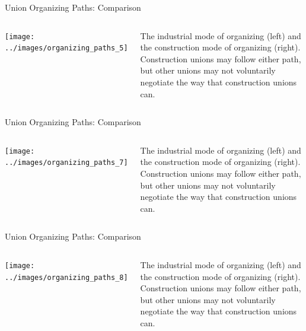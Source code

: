 \documentclass{beamer}
\begin{document}
%

\begin{frame}{Union Organizing Paths: Comparison} %
  \begin{columns}
    \texttt{[image: ../images/organizing\_paths\_5]}

    The industrial mode of organizing (left) and the construction mode of organizing (right).\newline\newline
    Construction unions may follow either path, but other unions may not voluntarily negotiate the way that construction unions can.
    \end{columns}
\end{frame}

\begin{frame}{Union Organizing Paths: Comparison} %
  \begin{columns}
    \texttt{[image: ../images/organizing\_paths\_7]}

    The industrial mode of organizing (left) and the construction mode of organizing (right).\newline\newline
    Construction unions may follow either path, but other unions may not voluntarily negotiate the way that construction unions can.
    \end{columns}
\end{frame}

\begin{frame}{Union Organizing Paths: Comparison} %
  \begin{columns}
    \texttt{[image: ../images/organizing\_paths\_8]}

    The industrial mode of organizing (left) and the construction mode of organizing (right).\newline\newline
    Construction unions may follow either path, but other unions may not voluntarily negotiate the way that construction unions can.
    \end{columns}
\end{frame}
\end{document}
